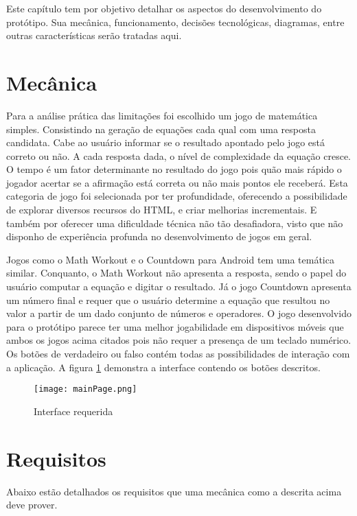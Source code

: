 Este capítulo tem por objetivo detalhar os aspectos do desenvolvimento
do protótipo. Sua mecânica, funcionamento, decisões tecnológicas,
diagramas, entre outras características serão tratadas aqui.

\section{Mecânica}

Para a análise prática das limitações foi escolhido um jogo de
matemática simples. Consistindo na geração de equações cada qual 
com uma resposta candidata. Cabe ao usuário informar se o resultado apontado
pelo jogo está correto ou não. A cada resposta dada, o nível de
complexidade da equação cresce. O tempo é um fator determinante
no resultado do jogo pois quão mais rápido o jogador acertar se a
afirmação está correta ou não mais pontos ele receberá. Esta
categoria de jogo foi selecionada por ter profundidade, oferecendo a
possibilidade de explorar diversos recursos do HTML, e criar melhorias
incrementais. E também por oferecer uma dificuldade técnica não
tão desafiadora, visto que não disponho de experiência profunda no
desenvolvimento de jogos em geral.

Jogos como o Math Workout e o Countdown para Android tem uma temática
similar. Conquanto, o Math Workout não apresenta a resposta, sendo o
papel do usuário computar a equação e digitar o resultado. Já o jogo
Countdown apresenta um número final e requer que o usuário determine
a equação que resultou no valor a partir de um dado conjunto de
números e operadores. O jogo desenvolvido para o protótipo parece ter
uma melhor jogabilidade em dispositivos móveis que ambos os jogos acima
citados pois não requer a presença de um teclado numérico. Os botões
de verdadeiro ou falso contém todas as possibilidades de interação
com a aplicação. A figura \ref{fig:sketch} demonstra a interface
contendo os botões descritos.

\begin{figure}[H]
    \centering
    \texttt{[image: mainPage.png]}
	\caption{Interface requerida}
    \label{fig:sketch}
\end{figure}



\section{Requisitos}

Abaixo estão detalhados os requisitos que uma mecânica como a descrita
acima deve prover.

